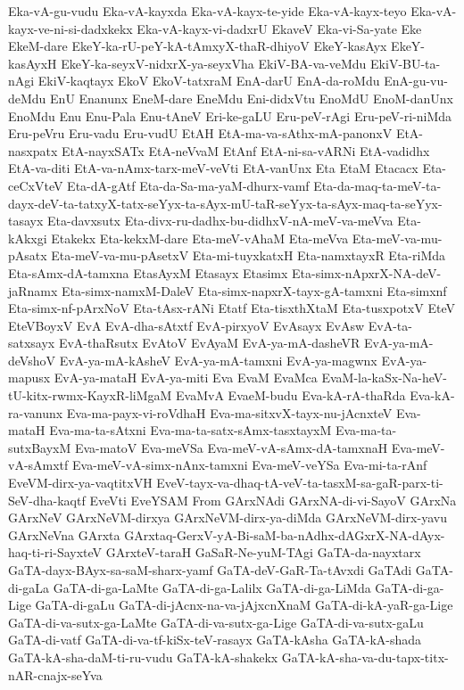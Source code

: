 {Eka-vA-gu-vudu
Eka-vA-kayxda
Eka-vA-kayx-te-yide
Eka-vA-kayx-teyo
Eka-vA-kayx-ve-ni-si-dadxkekx
Eka-vA-kayx-vi-dadxrU
EkaveV
Eka-vi-Sa-yate
Eke
EkeM-dare
EkeY-ka-rU-peY-kA-tAmxyX-thaR-dhiyoV
EkeY-kasAyx
EkeY-kasAyxH
EkeY-ka-seyxV-nidxrX-ya-seyxVha
EkiV-BA-va-veMdu
EkiV-BU-ta-nAgi
EkiV-kaqtayx
EkoV
EkoV-tatxraM
EnA-darU
EnA-da-roMdu
EnA-gu-vu-deMdu
EnU
Enanunx
EneM-dare
EneMdu
Eni-didxVtu
EnoMdU
EnoM-danUnx
EnoMdu
Enu
Enu-Pala
Enu-tAneV
Eri-ke-gaLU
Eru-peV-rAgi
Eru-peV-ri-niMda
Eru-peVru
Eru-vadu
Eru-vudU
EtAH
EtA-ma-va-sAthx-mA-panonxV
EtA-nasxpatx
EtA-nayxSATx
EtA-neVvaM
EtAnf
EtA-ni-sa-vARNi
EtA-vadidhx
EtA-va-diti
EtA-va-nAmx-tarx-meV-veVti
EtA-vanUnx
Eta
EtaM
Etacacx
Eta-ceCxVteV
Eta-dA-gAtf
Eta-da-Sa-ma-yaM-dhurx-vamf
Eta-da-maq-ta-meV-ta-dayx-deV-ta-tatxyX-tatx-seYyx-ta-sAyx-mU-taR-seYyx-ta-sAyx-maq-ta-seYyx-tasayx
Eta-davxsutx
Eta-divx-ru-dadhx-bu-didhxV-nA-meV-va-meVva
Eta-kAkxgi
Etakekx
Eta-kekxM-dare
Eta-meV-vAhaM
Eta-meVva
Eta-meV-va-mu-pAsatx
Eta-meV-va-mu-pAsetxV
Eta-mi-tuyxkatxH
Eta-namxtayxR
Eta-riMda
Eta-sAmx-dA-tamxna
EtasAyxM
Etasayx
Etasimx
Eta-simx-nApxrX-NA-deV-jaRnamx
Eta-simx-namxM-DaleV
Eta-simx-napxrX-tayx-gA-tamxni
Eta-simxnf
Eta-simx-nf-pArxNoV
Eta-tAsx-rANi
Etatf
Eta-tisxthXtaM
Eta-tusxpotxV
EteV
EteVBoyxV
EvA
EvA-dha-sAtxtf
EvA-pirxyoV
EvAsayx
EvAsw
EvA-ta-satxsayx
EvA-thaRsutx
EvAtoV
EvAyaM
EvA-ya-mA-dasheVR
EvA-ya-mA-deVshoV
EvA-ya-mA-kAsheV
EvA-ya-mA-tamxni
EvA-ya-magwnx
EvA-ya-mapusx
EvA-ya-mataH
EvA-ya-miti
Eva
EvaM
EvaMca
EvaM-la-kaSx-Na-heV-tU-kitx-rwmx-KayxR-liMgaM
EvaMvA
EvaeM-budu
Eva-kA-rA-thaRda
Eva-kA-ra-vanunx
Eva-ma-payx-vi-roVdhaH
Eva-ma-sitxvX-tayx-nu-jAcnxteV
Eva-mataH
Eva-ma-ta-sAtxni
Eva-ma-ta-satx-sAmx-tasxtayxM
Eva-ma-ta-sutxBayxM
Eva-matoV
Eva-meVSa
Eva-meV-vA-sAmx-dA-tamxnaH
Eva-meV-vA-sAmxtf
Eva-meV-vA-simx-nAnx-tamxni
Eva-meV-veYSa
Eva-mi-ta-rAnf
EveVM-dirx-ya-vaqtitxVH
EveV-tayx-va-dhaq-tA-veV-ta-tasxM-sa-gaR-parx-ti-SeV-dha-kaqtf
EveVti
EveYSAM
From
GArxNAdi
GArxNA-di-vi-SayoV
GArxNa
GArxNeV
GArxNeVM-dirxya
GArxNeVM-dirx-ya-diMda
GArxNeVM-dirx-yavu
GArxNeVna
GArxta
GArxtaq-GerxV-yA-Bi-saM-ba-nAdhx-dAGxrX-NA-dAyx-haq-ti-ri-SayxteV
GArxteV-taraH
GaSaR-Ne-yuM-TAgi
GaTA-da-nayxtarx
GaTA-dayx-BAyx-sa-saM-sharx-yamf
GaTA-deV-GaR-Ta-tAvxdi
GaTAdi
GaTA-di-gaLa
GaTA-di-ga-LaMte
GaTA-di-ga-Lalilx
GaTA-di-ga-LiMda
GaTA-di-ga-Lige
GaTA-di-gaLu
GaTA-di-jAcnx-na-va-jAjxcnXnaM
GaTA-di-kA-yaR-ga-Lige
GaTA-di-va-sutx-ga-LaMte
GaTA-di-va-sutx-ga-Lige
GaTA-di-va-sutx-gaLu
GaTA-di-vatf
GaTA-di-va-tf-kiSx-teV-rasayx
GaTA-kAsha
GaTA-kA-shada
GaTA-kA-sha-daM-ti-ru-vudu
GaTA-kA-shakekx
GaTA-kA-sha-va-du-tapx-titx-nAR-cnajx-seYva
}
